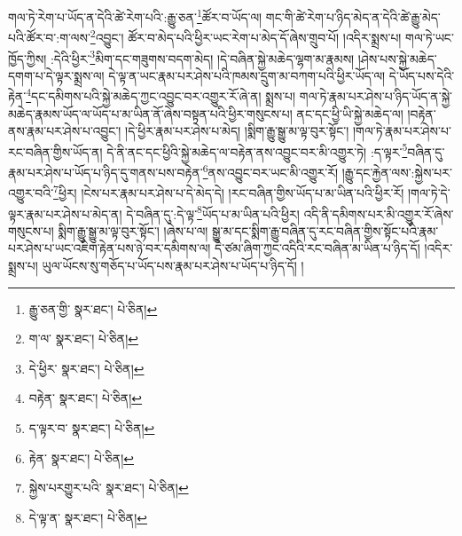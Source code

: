 གལ་ཏེ་རེག་པ་ཡོད་ན་དེའི་ཚེ་རེག་པའི་:རྒྱུ་ཅན་\footnote{རྒྱུ་ཅན་གྱི་  སྣར་ཐང་།  པེ་ཅིན། }ཚོར་བ་ཡོད་ལ། གང་གི་ཚེ་རེག་པ་ཉིད་མེད་ན་དེའི་ཚེ་རྒྱུ་མེད་པའི་ཚོར་བ་:ག་ལས་\footnote{ག་ལ་  སྣར་ཐང་།  པེ་ཅིན། }འབྱུང་། ཚོར་བ་མེད་པའི་ཕྱིར་ཡང་རེག་པ་མེད་དོ་ཞེས་གྲུབ་པོ། །འདིར་སྨྲས་པ། གལ་ཏེ་ཡང་ཁྱོད་ཀྱིས། :དེའི་ཕྱིར་\footnote{དེ་ཕྱིར་  སྣར་ཐང་།  པེ་ཅིན། }མིག་དང་གཟུགས་བདག་མེད། །དེ་བཞིན་སྐྱེ་མཆེད་ལྷག་མ་རྣམས། །ཤེས་པས་སྐྱེ་མཆེད་དགག་པ་དེ་ལྟར་སྨྲས་ལ། དེ་ལྟ་ན་ཡང་རྣམ་པར་ཤེས་པའི་ཁམས་དྲུག་མ་བཀག་པའི་ཕྱིར་ཡོད་ལ། དེ་ཡོད་པས་དེའི་རྟེན་\footnote{བརྟེན་  སྣར་ཐང་།  པེ་ཅིན། }དང་དམིགས་པའི་སྐྱེ་མཆེད་ཀྱང་འབྱུང་བར་འགྱུར་རོ་ཞེ་ན། སྨྲས་པ། གལ་ཏེ་རྣམ་པར་ཤེས་པ་ཉིད་ཡོད་ན་སྐྱེ་མཆེད་རྣམས་ཡོད་ལ་ཡོད་པ་མ་ཡིན་ནོ་ཞེས་བསྟན་པའི་ཕྱིར་གསུངས་པ། ནང་དང་ཕྱི་ཡི་སྐྱེ་མཆེད་ལ། །བརྟེན་ནས་རྣམ་པར་ཤེས་པ་འབྱུང་། །དེ་ཕྱིར་རྣམ་པར་ཤེས་པ་མེད། །སྨིག་རྒྱུ་སྒྱུ་མ་ལྟ་བུར་སྟོང་། །གལ་ཏེ་རྣམ་པར་ཤེས་པ་རང་བཞིན་གྱིས་ཡོད་ན། དེ་ནི་ནང་དང་ཕྱིའི་སྐྱེ་མཆེད་ལ་བརྟེན་ནས་འབྱུང་བར་མི་འགྱུར་ཏེ། :ད་ལྟར་\footnote{ད་ལྟར་བ་  སྣར་ཐང་།  པེ་ཅིན། }བཞིན་དུ་རྣམ་པར་ཤེས་པ་ཡོད་པ་ཉིད་དུ་གནས་པས་བརྟེན་\footnote{རྟེན་  སྣར་ཐང་།  པེ་ཅིན། }ནས་འབྱུང་བར་ཡང་མི་འགྱུར་རོ། །རྒྱུ་དང་རྐྱེན་ལས་:སྐྱེས་པར་འགྱུར་བའི་\footnote{སྐྱེས་པརགྱུར་པའི་  སྣར་ཐང་།  པེ་ཅིན། }ཕྱིར། །ངེས་པར་རྣམ་པར་ཤེས་པ་དེ་མེད་དེ། །རང་བཞིན་གྱིས་ཡོད་པ་མ་ཡིན་པའི་ཕྱིར་རོ། །གལ་ཏེ་དེ་ལྟར་རྣམ་པར་ཤེས་པ་མེད་ན། དེ་བཞིན་དུ་:དེ་ལྟ་\footnote{དེ་ལྟ་ན་  སྣར་ཐང་།  པེ་ཅིན། }ཡོད་པ་མ་ཡིན་པའི་ཕྱིར། འདི་ནི་དམིགས་པར་མི་འགྱུར་རོ་ཞེས་གསུངས་པ། སྨིག་རྒྱུ་སྒྱུ་མ་ལྟ་བུར་སྟོང་། །ཞེས་པ་ལ། སྒྱུ་མ་དང་སྨིག་རྒྱུ་བཞིན་དུ་རང་བཞིན་གྱིས་སྟོང་པའི་རྣམ་པར་ཤེས་པ་ཡང་འཇིག་རྟེན་པས་ཉེ་བར་དམིགས་ལ། དེ་ཙམ་ཞིག་ཀྱང་འདིའི་རང་བཞིན་མ་ཡིན་པ་ཉིད་དོ། །འདིར་སྨྲས་པ། ཡུལ་ཡོངས་སུ་གཅོད་པ་ཡོད་པས་རྣམ་པར་ཤེས་པ་ཡོད་པ་ཉིད་དོ། །
